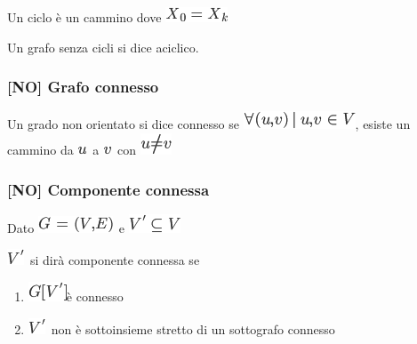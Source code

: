 \documentclass{article}
\providecommand{\tightlist}{%
  \setlength{\itemsep}{0pt}\setlength{\parskip}{0pt}}
\begin{document}
{Un ciclo è un cammino dove }\includegraphics{images/image353.png}

{Un grafo senza cicli si dice }{aciclico.}

\hypertarget{h.rpdf8j1vq7g0}{\subsubsection{\texorpdfstring{{{[}NO{]}
Grafo connesso}}{{[}NO{]} Grafo connesso}}\label{h.rpdf8j1vq7g0}}

{Un grado non orientato si dice connesso se
}\includegraphics{images/image354.png}{, esiste un cammino da
}\includegraphics{images/image103.png}{~a
}\includegraphics{images/image76.png}{~con
}\includegraphics{images/image355.png}

\hypertarget{h.iejp6ankfctp}{\subsubsection{\texorpdfstring{{{[}NO{]}
Componente
connessa}}{{[}NO{]} Componente connessa}}\label{h.iejp6ankfctp}}

{Dato }\includegraphics{images/image335.png}{~e
}\includegraphics{images/image342.png}

\includegraphics{images/image344.png}{~si dirà componente connessa se }

\begin{enumerate}
\tightlist
\item
  \includegraphics{images/image356.png}{è connesso}
\item
  \includegraphics{images/image344.png}{~non è sottoinsieme stretto di
  un sottografo connesso}
\end{enumerate}
\end{document}
